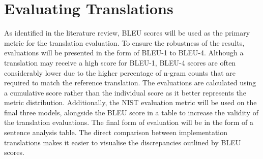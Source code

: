 \section{Evaluating Translations}
\label{sec:3-evaluating}

As identified in the literature review, \acrshort{BLEU} scores will be used as the primary metric for the translation evaluation. To ensure the robustness of the results, evaluations will be presented in the form of \acrshort{BLEU}-1 to \acrshort{BLEU}-4. Although a translation may receive a high score for \acrshort{BLEU}-1, \acrshort{BLEU}-4 scores are often considerably lower due to the higher percentage of n-gram counts that are required to match the reference translation. The evaluations are calculated using a cumulative score rather than the individual score as it better represents the metric distribution. Additionally, the \acrshort{NIST} evaluation metric will be used on the final three models, alongside the \acrshort{BLEU} score in a table to increase the validity of the translation evaluations. The final form of evaluation will be in the form of a sentence analysis table. The direct comparison between implementation translations makes it easier to visualise the discrepancies outlined by \acrshort{BLEU} scores.